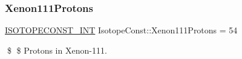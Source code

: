\subsubsection{\texorpdfstring{Xenon111\+Protons}{Xenon111Protons}}
{\footnotesize\ttfamily \mbox{\hyperlink{group___isotope_const-_macros_ga5f18360b3e99483a35c32d789e62621c}{I\+S\+O\+T\+O\+P\+E\+C\+O\+N\+S\+T\+\_\+\+I\+NT}} Isotope\+Const\+::\+Xenon111\+Protons = 54}

\$ \$ Protons in Xenon-\/111. 